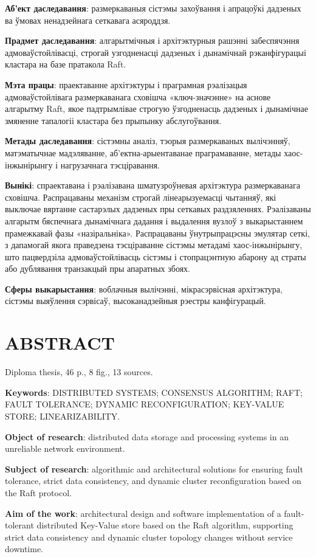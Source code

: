 \textbf{Аб’ект даследавання}: размеркаваныя сістэмы захоўвання і апрацоўкі дадзеных ва ўмовах ненадзейнага сеткавага асяроддзя.

\textbf{Прадмет даследавання}: алгарытмічныя і архітэктурныя рашэнні забеспячэння адмоваўстойлівасці, строгай узгодненасці дадзеных і дынамічнай рэканфігурацыі кластара на базе пратакола Raft.

\textbf{Мэта працы}: праектаванне архітэктуры і праграмная рэалізацыя адмоваўстойлівага размеркаванага сховішча «ключ-значэнне» на аснове алгарытму Raft, якое падтрымлівае строгую ўзгодненасць дадзеных і дынамічнае змяненне тапалогіі кластара без прыпынку абслугоўвання.

\textbf{Метады даследавання}: сістэмны аналіз, тэорыя размеркаваных вылічэнняў, матэматычнае мадэляванне, аб'ектна-арыентаванае праграмаванне, метады хаос-інжынірынгу і нагрузачнага тэсціравання.

\textbf{Вынікі}: спраектавана і рэалізавана шматузроўневая архітэктура размеркаванага сховішча. Распрацаваны механізм строгай лінеарызуемасці чытанняў, які выключае вяртанне састарэлых дадзеных пры сеткавых раздзяленнях. Рэалізаваны алгарытм бяспечнага дынамічнага дадання і выдалення вузлоў з выкарыстаннем прамежкавай фазы «назіральніка». Распрацаваны ўнутрыпрацэсны эмулятар сеткі, з дапамогай якога праведзена тэсціраванне сістэмы метадамі хаос-інжынірынгу, што пацвердзіла адмоваўстойлівасць сістэмы і стопрацэнтную абарону ад страты або дублявання транзакцый пры апаратных збоях.

\textbf{Сферы выкарыстання}: воблачныя вылічэнні, мікрасэрвісная архітэктура, сістэмы выяўлення сэрвісаў, высоканадзейныя рэестры канфігурацый.

\chapter*{ABSTRACT}
Diploma thesis, 46 p., 8 fig., 13 sources.

\textbf{Keywords}: DISTRIBUTED SYSTEMS; CONSENSUS ALGORITHM; RAFT; FAULT TOLERANCE; DYNAMIC RECONFIGURATION; KEY-VALUE STORE; LINEARIZABILITY.

\textbf{Object of research}: distributed data storage and processing systems in an unreliable network environment.

\textbf{Subject of research}: algorithmic and architectural solutions for ensuring fault tolerance, strict data consistency, and dynamic cluster reconfiguration based on the Raft protocol.

\textbf{Aim of the work}: architectural design and software implementation of a fault-tolerant distributed Key-Value store based on the Raft algorithm, supporting strict data consistency and dynamic cluster topology changes without service downtime.


